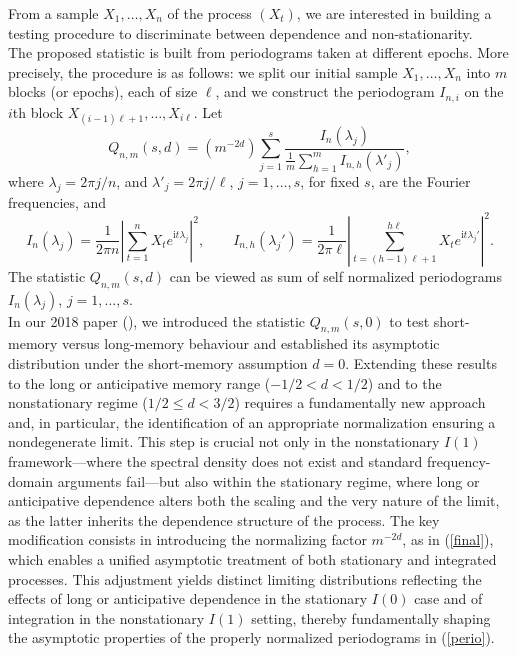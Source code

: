 \documentclass[12pt]{article}
\def\i{\mathrm{i}}
\begin{document}
From a sample $X_1,\ldots,X_n$ of the process $(X_t)$, we are
interested in building a testing procedure to discriminate between dependence and non-stationarity. \\
The proposed statistic is built from periodograms taken at different epochs. More precisely, the procedure is as follows:
we split our initial sample $X_1,\ldots,X_n$ into $m$ blocks (or
epochs), each of size $\ell$, and  we construct  the periodogram
$I_{n,i}$ on the $i$th block $X_{(i-1) \ell+1},\ldots,X_{i\ell }$.
Let
\begin{equation}\label{final}
Q_{n,m}(s,d)=\left(m^{-2d}\right)\sum_{j=1}^s \frac{I_n(\lambda_j)}{\frac{1}{m}\sum_{h=1}^mI_{n,h}(\lambda'_j)},
\end{equation}
where $\lambda_j=2\pi j/n$, and  $\lambda'_j=2\pi j/\ell$, $j=1,\ldots,s$, for fixed $s$, are the Fourier frequencies, and 
\begin{equation}\label{perio}
I_n(\lambda_j)=\frac{1}{2\pi n}\left\vert\sum_{t=1}^nX_te^{\i t\lambda_j}\right\vert^2,\qquad I_{n,h}(\lambda_j')=\frac{1}{2\pi \ell}\left\vert\sum_{t=(h-1)\ell+1}^{h\ell}X_te^{\i t\lambda_j'}\right\vert^2.
\end{equation}
The statistic $Q_{n,m}(s,d)$ can be viewed as sum of self normalized periodograms $I_n(\lambda_j)$, $j=1,\ldots,s$.\\
In our 2018 paper (\cite{Gromykov}), we introduced the statistic $Q_{n,m}(s,0)$ to test short-memory versus long-memory behaviour and established its asymptotic distribution under the short-memory assumption $d=0$. Extending these results to the long or anticipative memory range ($-1/2<d<1/2$) and to the nonstationary regime ($1/2\le d<3/2$) requires a fundamentally new approach and, in particular, the identification of an appropriate normalization ensuring a nondegenerate limit. This step is crucial not only in the nonstationary $I(1)$ framework---where the spectral density does not exist and standard frequency-domain arguments fail---but also within the stationary regime, where long or anticipative dependence alters both the scaling and the very nature of the limit, as the latter inherits the dependence structure of the process. The key modification consists in introducing the normalizing factor $m^{-2d}$, as in (\ref{final}), which enables a unified asymptotic treatment of both stationary and integrated processes. This adjustment yields distinct limiting distributions reflecting the effects of long or anticipative dependence in the stationary $I(0)$ case and of integration in the nonstationary $I(1)$ setting, thereby fundamentally shaping the asymptotic properties of the properly normalized periodograms in (\ref{perio}).
  
\end{document}
